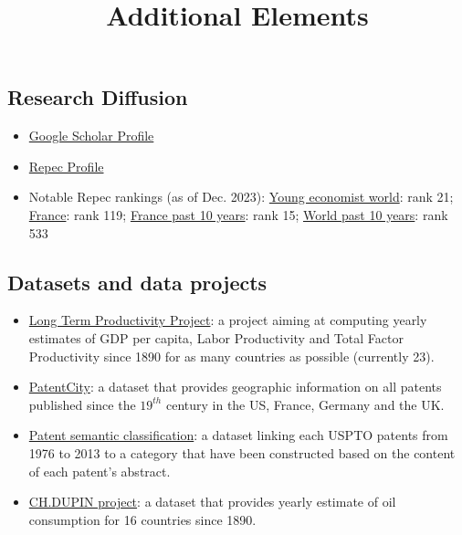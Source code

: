 \documentclass[12pt]{article}
\begin{document}
\title{\textbf{Additional Elements}}
\date{}
\maketitle

\subsection*{Research Diffusion}

\begin{itemize}
   
\item \href{https://scholar.google.com/citations?user=ond43GsAAAAJ}{Google Scholar Profile}

\item \href{https://ideas.repec.org/f/pbe904.html}{Repec Profile}

\item Notable Repec rankings (as of Dec. 2023): \href{https://ideas.repec.org/top/old/2312/top.young.html}{Young economist world}: rank 21; \href{https://ideas.repec.org/top/old/2312/top.france.html#authors}{France}: rank 119; \href{https://ideas.repec.org/top/old/2312/top.france.html#authors10}{France past 10 years}: rank 15; \href{https://ideas.repec.org/top/old/2312/top.person.all10.html}{World past 10 years}: rank 533
\end{itemize}
\subsection*{Datasets and data projects}

\begin{itemize}
\item \href{http://longtermproductivity.com/}{Long Term Productivity Project}: a project aiming at computing yearly estimates of GDP per capita, Labor Productivity and Total Factor Productivity since 1890 for as many countries as possible (currently 23). 

\item \href{https://cverluise.github.io/patentcity/}{PatentCity}: a dataset that provides geographic information on all patents published since the $19^{th}$ century in the US, France, Germany and the UK.

\item \href{https://dataverse.harvard.edu/dataset.xhtml?id=3010354}{Patent semantic classification}: a dataset linking each USPTO patents from 1976 to 2013 to a category that have been constructed based on the content of each patent's abstract.

\item \href{http://www.longtermproductivity.com/chdupin/}{CH.DUPIN project}: a dataset that provides yearly estimate of oil consumption for 16 countries since 1890.

\end{itemize}
\end{document}
